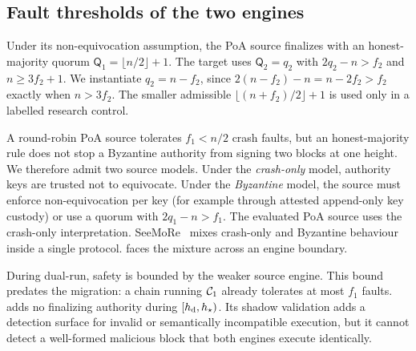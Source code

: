 \subsection{Fault thresholds of the two engines}
\label{subsec:thresholds}
Under its non-equivocation assumption, the PoA source finalizes with an honest-majority quorum
$\mathsf Q_1=\lfloor n/2\rfloor+1$. The target uses $\mathsf Q_2=q_2$ with $2q_2-n>f_2$ and
$n\ge 3f_2+1$. We instantiate $q_2=n-f_2$, since $2(n-f_2)-n=n-2f_2>f_2$ exactly when $n>3f_2$. The
smaller admissible $\lfloor(n+f_2)/2\rfloor+1$ is used only in a labelled research control.

A round-robin PoA source tolerates $f_1<n/2$ crash faults, but an honest-majority rule does not stop
a Byzantine authority from signing two blocks at one height. We therefore admit two source models.
Under the \emph{crash-only} model, authority keys are trusted not to equivocate. Under the
\emph{Byzantine} model, the source must enforce non-equivocation per key (for example through attested
append-only key custody) or use a quorum with $2q_1-n>f_1$. The evaluated PoA source uses the
crash-only interpretation. SeeMoRe~\cite{seemore} mixes crash-only and Byzantine behaviour inside a
single protocol. \sage{} faces the mixture across an engine boundary.

During dual-run, safety is bounded by the weaker source engine. This bound predates the migration: a
chain running $\mathcal{C}_1$ already tolerates at most $f_1$ faults. \sage{} adds no finalizing authority
during $[h_{\mathrm d},h_{\star})$. Its shadow validation adds a detection surface for invalid or semantically
incompatible execution, but it cannot detect a well-formed malicious block that both engines execute
identically.

